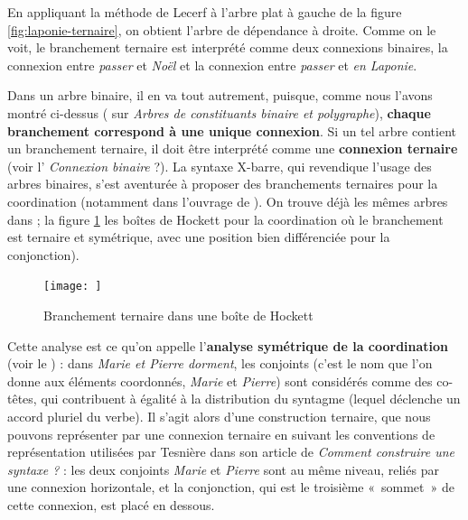 {    En appliquant la méthode de Lecerf à l’arbre plat à gauche de la figure \ref{fig:laponie-ternaire}, on obtient l’arbre de dépendance à droite. Comme on le voit, le branchement ternaire est interprété comme deux connexions binaires, la connexion entre \textit{passer} et \textit{Noël} et la connexion entre \textit{passer} et \textit{en Laponie}.

    Dans un arbre binaire, il en va tout autrement, puisque, comme nous l’avons montré ci-dessus ( sur \textit{Arbres de constituants binaire et polygraphe}), \textbf{chaque branchement correspond à une unique connexion}. Si un tel arbre contient un branchement ternaire, il doit être interprété comme une \textbf{connexion ternaire} (voir l’ \textit{Connexion binaire} ?). La syntaxe X-barre, qui revendique l’usage des arbres binaires, s’est aventurée à proposer des branchements ternaires pour la coordination (notamment dans l'ouvrage de \citealt{jackendoff1977x}). On trouve déjà les mêmes arbres dans \citealt{hockett1958course} ; la figure \ref{fig:hockett-coord} les boîtes de Hockett pour la coordination où le branchement est ternaire et symétrique, avec une position bien différenciée pour la conjonction).

\begin{figure}
    \centering
    \texttt{[image: ]}
    \caption{\label{fig:hockett-coord}Branchement ternaire dans une boîte de Hockett}
\end{figure}


    Cette analyse est ce qu’on appelle l’\textbf{analyse symétrique de la coordination} (voir le ) : dans \textit{Marie et Pierre dorment}, les conjoints (c’est le nom que l’on donne aux éléments coordonnés, \textit{Marie} et \textit{Pierre}) sont considérés comme des co-têtes, qui contribuent à égalité à la distribution du syntagme (lequel déclenche un accord pluriel du verbe). Il s’agit alors d’une construction ternaire, que nous pouvons représenter par une connexion ternaire en suivant les conventions de représentation utilisées par Tesnière dans son article de \citeyear{tesniere1934comment} \textit{Comment construire une syntaxe ?} : les deux conjoints \textit{Marie} et \textit{Pierre} sont au même niveau, reliés par une connexion horizontale, et la conjonction, qui est le troisième «~sommet~» de cette connexion, est placé en dessous.

}
